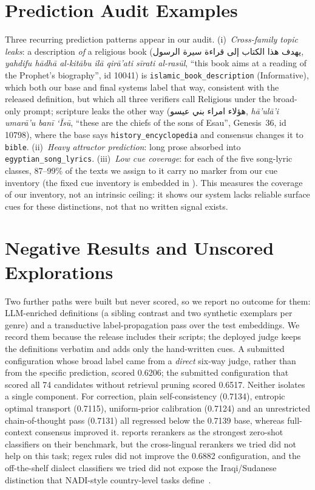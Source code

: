 \documentclass[11pt]{article}
\newcommand{\ar}[1]{\textarabic{#1}}
\begin{document}
\section{Prediction Audit Examples}
\label{app:errors}
Three recurring prediction patterns appear in our audit. (i)~\emph{Cross-family topic leaks}: a description \emph{of} a
religious book (\ar{يهدف هذا الكتاب إلى قراءة سيرة الرسول}, \emph{yahdifu h\=adh\=a al-kit\=abu
il\=a qir\=a'ati s\=irati al-ras\=ul}, ``this book aims at a reading of the Prophet's
biography'', id 10041) is
\texttt{islamic\_book\_description} (Informative), which both our base and final systems label
that way, consistent with the released definition, but which all three verifiers call Religious
under the broad-only prompt; scripture leaks the other way
(\ar{هؤلاء امراء بني عيسو}, \emph{h\=a'ul\=a'i umar\=a'u ban\=i `\=Is\=u}, ``these are the
chiefs of the sons of Esau'', Genesis~36, id 10798), where the base says
\texttt{history\_encyclopedia} and consensus changes it to \texttt{bible}. (ii)~\emph{Heavy attractor prediction}: long prose absorbed into \texttt{egyptian\_song\_lyrics}.
(iii)~\emph{Low cue coverage}: for each of the five song-lyric classes, 87--99\% of the texts we
assign to it carry no marker from our cue inventory
(the fixed cue inventory is embedded in ). This measures the
coverage of our inventory, not an intrinsic ceiling: it shows our system lacks reliable surface
cues for these distinctions, not that no written signal exists.

\section{Negative Results and Unscored Explorations}
\label{app:negative}
Two further paths were built but never scored, so we report no outcome for them:
LLM-enriched definitions (a sibling contrast and two synthetic exemplars per genre) and a
transductive label-propagation pass over the test embeddings. We record them because the release
includes their scripts; the deployed judge keeps the definitions verbatim and adds only the
hand-written cues. A submitted configuration whose broad label came from a \emph{direct} six-way judge, rather than
from the specific prediction, scored 0.6206; the submitted configuration that scored all 74
candidates without retrieval pruning scored 0.6517. Neither isolates a single component. For correction, plain self-consistency (0.7134), entropic optimal transport
(0.7115), uniform-prior calibration (0.7124) and an unrestricted chain-of-thought pass (0.7131)
all regressed below the 0.7139 base, whereas full-context consensus improved it. \citet{btzsc2026} reports rerankers as the strongest zero-shot classifiers on their benchmark,
but the cross-lingual rerankers we tried did not help on this task; regex rules did not improve the 0.6882 configuration, and
the off-the-shelf dialect classifiers we tried did not expose the Iraqi/Sudanese
distinction that NADI-style country-level tasks define~\citep{nadi2021}.
\end{document}
